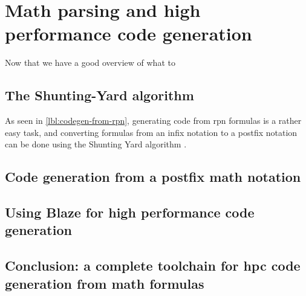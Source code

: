\documentclass[../main]{subfiles}
\begin{document}

\section{
  Math parsing and high performance code generation
}

Now that we have a good overview of what to

\subsection{
  The Shunting-Yard algorithm
}

As seen in \ref{lbl:codegen-from-rpn}, generating code from \gls{rpn} formulas
is a rather easy task, and converting formulas from an infix notation to a
postfix notation can be done using the Shunting Yard algorithm \cite{shunting-yard}.

\subsection{
  Code generation from a postfix math notation
}

\subsection{
  Using Blaze for high performance code generation
}


\subsection{
  Conclusion: a complete toolchain for \acrlong{hpc} code generation from math formulas
}
\end{document}
